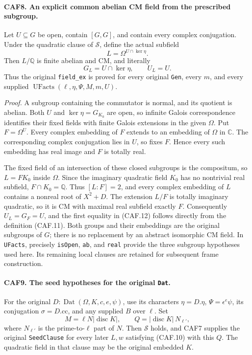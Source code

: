 \documentclass[11pt,a4paper]{article}
\numberwithin{equation}{section}
\theoremstyle{remark}\newtheorem{remark}[theorem]{Remark}
\begin{document}
\paragraph{CAF8. An explicit common abelian CM field from the prescribed subgroup.}
\label{claim:CAF8}
Let \(U\subseteq G\) be open, contain \([G,G]\), and contain
every complex conjugation.  Under the quadratic clause of
\(\mathcal S\), define the actual subfield
\[
                   L=\Omega^{U\cap\ker\eta}.
 \tag{CAF.11}
\]
Then \(L/\mathbb Q\) is finite abelian and CM, and literally
\[
             G_L=U\cap\ker\eta,\qquad U_L=U.
 \tag{CAF.12}
\]
Thus the original \texttt{field\_\allowbreak ex} is proved for every original
\texttt{Gen}, every \(m\), and every supplied
\(\operatorname{UFacts}(\ell,\eta,\Psi,M,m,U)\).

\emph{Proof.}
A subgroup containing the commutator is normal, and its quotient is
abelian.  Both \(U\) and \(\ker\eta=G_{K_0}\) are open, so
infinite Galois correspondence identifies their fixed fields with
finite Galois extensions in the given \(\Omega\).  Put
\(F=\Omega^U\).  Every complex embedding of \(F\) extends to an
embedding of \(\Omega\) in \(\mathbb C\).  The corresponding
complex conjugation lies in \(U\), so fixes \(F\).  Hence every
such embedding has real image and \(F\) is totally real.

The fixed field of an intersection of these closed subgroups is the
compositum, so \(L=FK_0\) inside \(\Omega\).  Since the imaginary
quadratic field \(K_0\) has no nontrivial real subfield,
\(F\cap K_0=\mathbb Q\).  Thus \([L:F]=2\), and every complex
embedding of \(L\) contains a nonreal root of \(X^2+D\).
The extension \(L/F\) is totally imaginary quadratic, so it is CM
with maximal real subfield exactly \(F\).  Consequently
\(U_L=G_F=U\), and the first equality in (CAF.12) follows directly
from the definition (CAF.11).  Both groups and their embeddings are
the original subgroups of \(G\); there is no replacement by an
abstract isomorphic CM field.  In \texttt{UFacts}, precisely
\texttt{is\allowbreak Open}, \texttt{ab}, and \texttt{real} provide the three
subgroup hypotheses used here.  Its remaining local clauses are
retained for subsequent frame construction.

\paragraph{CAF9. The seed hypotheses for the original \texttt{Dat}.}
\label{claim:CAF9}
For the original \(D:\operatorname{Dat}(\Omega,K,c,e,\psi)\),
use its characters \(\eta=D.\eta\), \(\Psi=\epsilon^e\psi\),
its conjugation \(\sigma=D.\mathrm{cc}\), and any supplied \(B\)
over \(\ell\).  Set
\[
 M=\ell N|\operatorname{disc}K|,
 \qquad Q=|\operatorname{disc}K|\,N_{\ell'},
 \tag{CAF.13}
\]
where \(N_{\ell'}\) is the prime-to-\(\ell\) part of \(N\).
Then \(\mathcal S\) holds, and CAF7 supplies the original
\texttt{Seed\allowbreak Clause} for every later \(L,w\) satisfying (CAF.10)
with this \(Q\).  The quadratic field in that clause may be the
original embedded \(K\).
\end{document}

